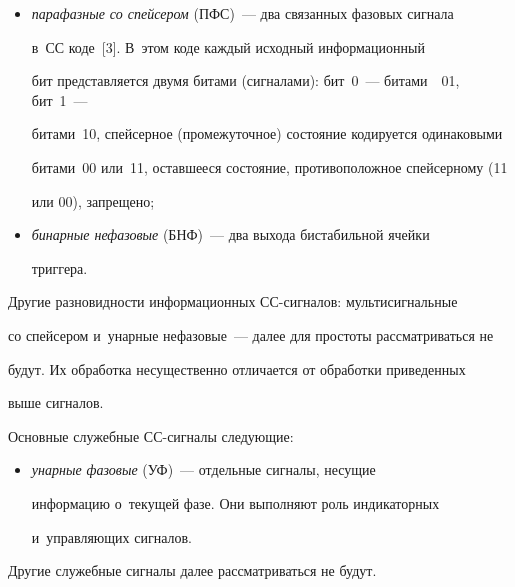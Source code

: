   \begin{itemize}


   \item 


   \textit{парафазные со спейсером} (ПФС)~--- два связанных фазовых сигнала 


в~СС коде~[3]. В~этом коде каждый исходный информационный 


бит представляется двумя битами (сигналами): бит~0~--- битами~~01, бит~1~--- 


битами~10, спейсерное (промежуточное) состояние кодируется одинаковыми 


битами~00 или~11, оставшееся состояние, противоположное спейсерному (11 


или 00), запрещено;


 \item  


   \textit{бинарные нефазовые} (БНФ)~--- два выхода бистабильной ячейки 


триггера.


\end{itemize}





   


   Другие разновидности информационных СС-сигналов: мультисигнальные 


со спейсером и~унарные нефазовые~--- далее для простоты рассматриваться не 


будут. Их обработка несущественно отличается от обработки приведенных 


выше сигналов.




   


   Основные служебные СС-сигналы следующие:


  \begin{itemize}


  \item  


   \textit{унарные фазовые} (УФ)~--- отдельные сигналы, несущие 


информацию о~те\-ку\-щей фазе. Они выполняют роль индикаторных 


и~управляющих сигналов.


\end{itemize}


   


   Другие служебные сигналы далее рассматриваться не будут.





